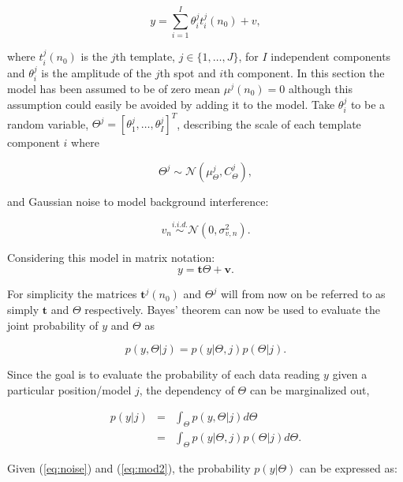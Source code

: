 \begin{equation}\label{eq:mod1}
y = \sum_{i=1}^{I} \theta_i^j t_i^j(n_0) + v,
\end{equation}

where $t_i^j(n_0)$ is the $j$th template, $j \in \{1, \ldots ,J\}$, for $I$ independent components and $\theta_i^j$ is the amplitude of the $j$th spot and $i$th component. In this section the model has been assumed to be of zero mean $\mu^j(n_0) =0$ although this assumption could easily be avoided by adding it to the model. Take $\theta_i^j$ to be a random variable, $\Theta^j = [\theta_1^j,\ldots,\theta_I^j]^T$, describing the scale of each template component $i$ where

\begin{equation}\label{eq:theta}
\Theta^j \sim \mathcal{N}(\mu_{\Theta}^j,C_{\Theta}^j),
\end{equation}

and Gaussian noise to model background interference:

\begin{equation}\label{eq:noise}
v_n \stackrel{i.i.d.}{\sim} \mathcal{N}(0,\sigma_{v,n}^2).
\end{equation}

Considering this model in matrix notation:
\begin{equation}\label{eq:mod2}
y = \textbf{t}\Theta + \textbf{v}.
\end{equation}

For simplicity the matrices $\textbf{t}^j(n_0)$ and $\Theta^j$ will from now on be referred to as simply $\textbf{t}$ and $\Theta$ respectively.
Bayes' theorem can now be used to evaluate the joint probability of $y$ and $\Theta$ as

\begin{equation}\label{eq:bayes1}
p(y,\Theta | j) = p(y|\Theta,j)p(\Theta | j).
\end{equation}

Since the goal is to evaluate the probability of each data reading $y$ given a particular position/model $j$, the dependency of $\Theta$ can be marginalized out,

\begin{eqnarray}\nonumber
p(y|j) &=& \int_\Theta p(y,\Theta|j) d\Theta \\
\label{eq:marg1} &=& \int_\Theta p(y|\Theta,j)p(\Theta|j) d\Theta.
\end{eqnarray}

Given (\ref{eq:noise}) and (\ref{eq:mod2}), the probability $p(y|\Theta)$ can be expressed as:

